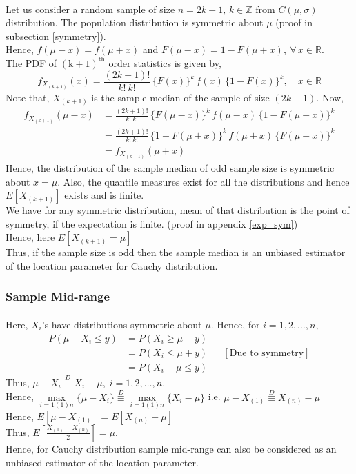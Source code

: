 \documentclass[12pt, fleqn, a4paper]{article}
\newcommand{\chy}{\(\mathit{C}(\mu, \sigma)\) }
\begin{document}
	\paragraph{} Let us consider a random sample of size \(n=2k+1,\,k\in\mathbb{Z}\) from \chy distribution. The population distribution is symmetric about \(\mu\) (proof in subsection \ref{symmetry}). \\ Hence, \(f(\mu-x)=f(\mu+x)\) and \(F(\mu-x)=1- F(\mu+x),\:\forall\,x\in\mathbb{R}\). \\
	The PDF of \(\mathrm{(k+1)^{th}}\) order statistics is given by, $$ f_{X_{(k+1)}}(x)=\frac{(2k+1)!}{k!\: k!}\,\{F(x)\}^k\,f(x)\,\{1-F(x)\}^k,\quad x\in \mathbb{R} $$ Note that, \(X_{(k+1)}\) is the sample median of the sample of size \((2k+1)\). Now, 
	\begin{align*}
		f_{X_{(k+1)}}(\mu-x)&=\frac{(2k+1)!} {k!\:k!}\,\{F(\mu-x)\}^k\,f(\mu-x)\,\{1-F(\mu-x)\}^k \\
		&=\frac{(2k+1)!}{k!\:k!}\,\{1-F(\mu+x)\}^k\,f(\mu+x)\,\{F(\mu+x)\}^k \\
		&=f_{X_{(k+1)}}(\mu+x)
	\end{align*}
	Hence, the distribution of the sample median of odd sample size is symmetric about \(x=\mu\). Also, the quantile measures exist for all the distributions and hence \(E\left[X_{(k+1)}\right]\) exists and is finite. \\
	We have for any symmetric distribution, mean of that distribution is the point of symmetry, if the expectation is finite. (proof in appendix \ref{exp_sym}) \\
	Hence, here \(E\left[X_{(k+1)}=\mu\right]\) \\
	Thus, if the sample size is odd then the sample median is an unbiased estimator of the location parameter for Cauchy distribution.
	
	\subsubsection*{Sample Mid-range}
	\paragraph{} Here, \(X_i\)'s have distributions symmetric about \(\mu\). Hence, for \(i=1,2,\ldots, n\), 
	\begin{align*}
		P(\mu-X_i\leq y)&=P(X_i\geq\mu-y) \\
		&=P(X_i\leq\mu+y) && [\text{Due to symmetry}] \\
		&=P(X_i-\mu\leq y)
	\end{align*}
	Thus, \(\mu-X_i\stackrel{D}{\equiv}X_i-\mu,\; i=1,2,\ldots,n\). \\[8pt] Hence, 
	\(\max\limits_{i=1(1)n}\{\mu-X_i\}\stackrel{D}{\equiv}\max\limits_{i=1(1)n}\{X_i-\mu\}\) i.e. \(\mu-X_{(1)} \stackrel{D}{\equiv}X_{(n)}-\mu\) \\[8pt]
	Hence, \(E\left[\mu-X_{(1)}\right]=E\left[ X_{(n)}-\mu\right]\) \\[8pt] Thus, \(E\left[\frac{X_{(1)}+X_{(n)}}{2}\right]=\mu\). \\[10pt] Hence, for Cauchy distribution sample mid-range can also be considered as an unbiased estimator of the location parameter. 
	
\end{document}
